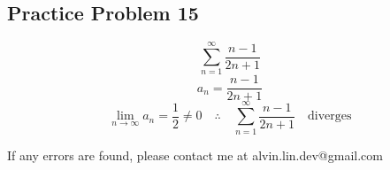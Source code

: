 \documentclass[letterpaper, 12pt]{math}
\begin{document}
\subsection*{Practice Problem 15}
\[ \sum_{n=1}^{\infty}\frac{n-1}{2n+1} \]
\[ a_{n} = \frac{n-1}{2n+1} \]
\[ \lim_{n\to\infty}a_{n} = \frac{1}{2} \neq 0 \quad \therefore \quad
   \sum_{n=1}^{\infty}\frac{n-1}{2n+1} \quad \mathrm{diverges} \]

\begin{center}
  If any errors are found, please contact me at alvin.lin.dev@gmail.com
\end{center}
\end{document}
